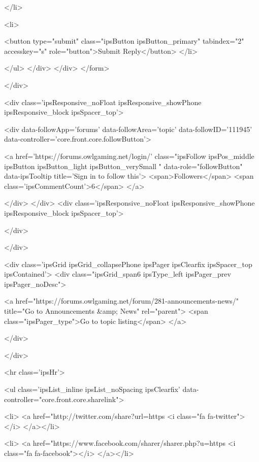 							</li>
						
					
				
				
					<li>

	<button type="submit" class="ipsButton ipsButton_primary" tabindex="2" accesskey="s"  role="button">Submit Reply</button>
</li>
				
			</ul>
		</div>
	</div>
</form>
			
		</div>
	

	
		<div class='ipsResponsive_noFloat ipsResponsive_showPhone ipsResponsive_block ipsSpacer_top'>
			

<div data-followApp='forums' data-followArea='topic' data-followID='111945' data-controller='core.front.core.followButton'>
	

	<a href='https://forums.owlgaming.net/login/' class="ipsFollow ipsPos_middle ipsButton ipsButton_light ipsButton_verySmall " data-role="followButton" data-ipsTooltip title='Sign in to follow this'>
		<span>Followers</span>
		<span class='ipsCommentCount'>6</span>
	</a>

</div>
		</div>
		<div class='ipsResponsive_noFloat ipsResponsive_showPhone ipsResponsive_block ipsSpacer_top'>
			



		</div>
	
</div>



<div class='ipsGrid ipsGrid_collapsePhone ipsPager ipsClearfix ipsSpacer_top ipsContained'>
	<div class="ipsGrid_span6 ipsType_left ipsPager_prev ipsPager_noDesc">
		
			<a href="https://forums.owlgaming.net/forum/281-announcements-news/" title="Go to Announcements &amp; News" rel="parent">
				<span class="ipsPager_type">Go to topic listing</span>
			</a>
		
	</div>
	
</div>


	<hr class='ipsHr'>
	

	<ul class='ipsList_inline ipsList_noSpacing ipsClearfix' data-controller="core.front.core.sharelink">
		
			<li>
<a href="http://twitter.com/share?url=https%
	<i class="fa fa-twitter"></i>
</a></li>
		
			<li>
<a href="https://www.facebook.com/sharer/sharer.php?u=https%
	<i class="fa fa-facebook"></i>
</a></li>
		
